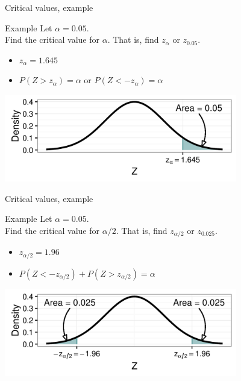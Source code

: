 \documentclass[xcolor=table, handout]{beamer}
\begin{document}
\begin{frame}{Critical values, example}
\begin{exampleblock}{Example}
Let $\alpha = 0.05$.\\
\medskip
Find the critical value for $\alpha$. That is, find $z_\alpha$ or $z_{0.05}$.
\begin{itemize}
\pause\item $z_\alpha = 1.645$
\item $P(Z > z_\alpha) = \alpha$ or $P(Z < -z_\alpha) = \alpha$
\end{itemize}
\end{exampleblock}
\smallskip
{\centering
\includegraphics[width=4in]{../images/ch6_crit1}
\par}

\end{frame}


\begin{frame}{Critical values, example}
\begin{exampleblock}{Example}
Let $\alpha = 0.05$.\\
\medskip
Find the critical value for $\alpha/2$. That is, find $z_{\alpha/2}$ or $z_{0.025}$.
\begin{itemize}
\pause\item $z_{\alpha/2} = 1.96$
\item $P(Z < -z_{\alpha/2}) + P(Z > z_{\alpha/2}) = \alpha$
\end{itemize}
\end{exampleblock}
\smallskip
{\centering
\includegraphics[width=4in]{../images/ch6_crit2}
\par}

\end{frame}
\end{document}
